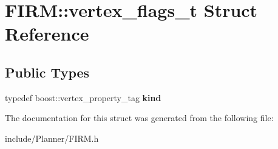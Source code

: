 \hypertarget{struct_f_i_r_m_1_1vertex__flags__t}{\section{\-F\-I\-R\-M\-:\-:vertex\-\_\-flags\-\_\-t \-Struct \-Reference}
\label{struct_f_i_r_m_1_1vertex__flags__t}
}
\subsection*{\-Public \-Types}
\begin{DoxyCompactItemize}
\item 
\hypertarget{struct_f_i_r_m_1_1vertex__flags__t_ac76c9256a586ee6d6f9253ada4929e13}{typedef boost\-::vertex\-\_\-property\-\_\-tag {\bfseries kind}}\label{struct_f_i_r_m_1_1vertex__flags__t_ac76c9256a586ee6d6f9253ada4929e13}

\end{DoxyCompactItemize}


\-The documentation for this struct was generated from the following file\-:\begin{DoxyCompactItemize}
\item 
include/\-Planner/\-F\-I\-R\-M.\-h\end{DoxyCompactItemize}

